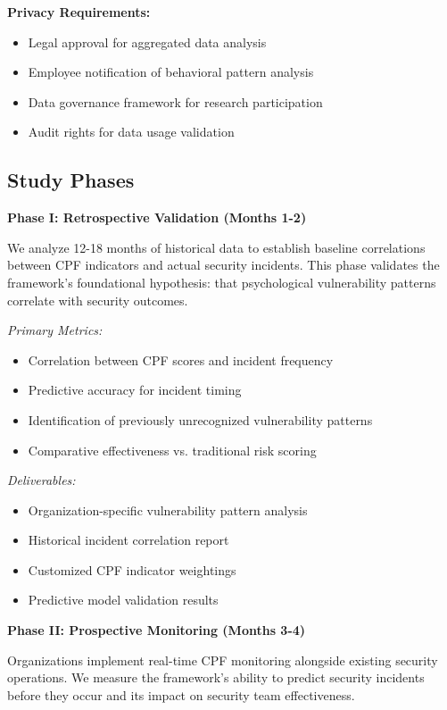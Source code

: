 \documentclass[11pt,a4paper]{article}
\begin{document}
\textbf{Privacy Requirements:}
\begin{itemize}
\item Legal approval for aggregated data analysis
\item Employee notification of behavioral pattern analysis
\item Data governance framework for research participation
\item Audit rights for data usage validation
\end{itemize}

\subsection{Study Phases}

\textbf{Phase I: Retrospective Validation (Months 1-2)}

We analyze 12-18 months of historical data to establish baseline correlations between CPF indicators and actual security incidents. This phase validates the framework's foundational hypothesis: that psychological vulnerability patterns correlate with security outcomes.

\textit{Primary Metrics:}
\begin{itemize}
\item Correlation between CPF scores and incident frequency
\item Predictive accuracy for incident timing
\item Identification of previously unrecognized vulnerability patterns
\item Comparative effectiveness vs. traditional risk scoring
\end{itemize}

\textit{Deliverables:}
\begin{itemize}
\item Organization-specific vulnerability pattern analysis
\item Historical incident correlation report
\item Customized CPF indicator weightings
\item Predictive model validation results
\end{itemize}

\textbf{Phase II: Prospective Monitoring (Months 3-4)}

Organizations implement real-time CPF monitoring alongside existing security operations. We measure the framework's ability to predict security incidents before they occur and its impact on security team effectiveness.
\end{document}

